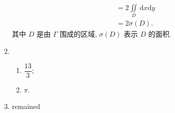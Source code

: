 \begin{enumerate}
\begin{align*}
            &= 2\iint\limits_{D}\,\mathrm{d}x\mathrm{d}y \\
            &= 2\sigma(D).   
        \end{align*}
        其中 $D$ 是由 $\Gamma$ 围成的区域, $\sigma(D)$ 表示 $D$ 的面积.
    \item %
        \begin{enumerate}[(1)]
            \item %
                $\dfrac{13}{3}$;
            \item %
                $\pi$.
        \end{enumerate}
    \item %
        {\color{red}remained}
\end{enumerate}
% 
